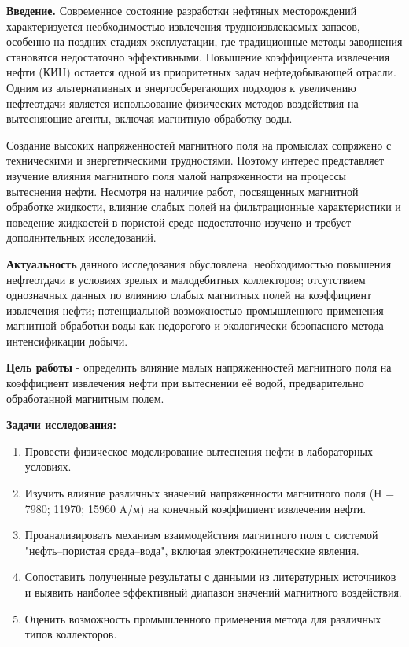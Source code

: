 \begin{multicols}{2}
{\bfseries Введение.} Современное состояние разработки нефтяных
месторождений характеризуется необходимостью извлечения
трудноизвлекаемых запасов, особенно на поздних стадиях эксплуатации, где
традиционные методы заводнения становятся недостаточно эффективными.
Повышение коэффициента извлечения нефти (КИН) остается одной из
приоритетных задач нефтедобывающей отрасли. Одним из альтернативных и
энергосберегающих подходов к увеличению нефтеотдачи является
использование физических методов воздействия на вытесняющие агенты,
включая магнитную обработку воды.

Создание высоких напряженностей магнитного поля на промыслах сопряжено с
техническими и энергетическими трудностями. Поэтому интерес представляет
изучение влияния магнитного поля малой напряженности на процессы
вытеснения нефти. Несмотря на наличие работ, посвященных магнитной
обработке жидкости, влияние слабых полей на фильтрационные
характеристики и поведение жидкостей в пористой среде недостаточно
изучено и требует дополнительных исследований.

{\bfseries Актуальность} данного исследования обусловлена: необходимостью
повышения нефтеотдачи в условиях зрелых и малодебитных коллекторов;
отсутствием однозначных данных по влиянию слабых магнитных полей на
коэффициент извлечения нефти; потенциальной возможностью промышленного
применения магнитной обработки воды как недорогого и экологически
безопасного метода интенсификации добычи.

{\bfseries Цель работы} - определить влияние малых напряженностей
магнитного поля на коэффициент извлечения нефти при вытеснении её водой,
предварительно обработанной магнитным полем.

{\bfseries Задачи исследования:}

\begin{enumerate}
\def\labelenumi{\arabic{enumi}.}
\item
  Провести физическое моделирование вытеснения нефти в лабораторных
  условиях.
\item
  Изучить влияние различных значений напряженности магнитного поля (H =
  7980; 11970; 15960 A/м) на конечный коэффициент извлечения нефти.
\item
  Проанализировать механизм взаимодействия магнитного поля с системой
  "нефть--пористая среда--вода", включая электрокинетические явления.
\item
  Сопоставить полученные результаты с данными из литературных источников
  и выявить наиболее эффективный диапазон значений магнитного
  воздействия.
\item
  Оценить возможность промышленного применения метода для различных
  типов коллекторов.
\end{enumerate}


\end{multicols}
